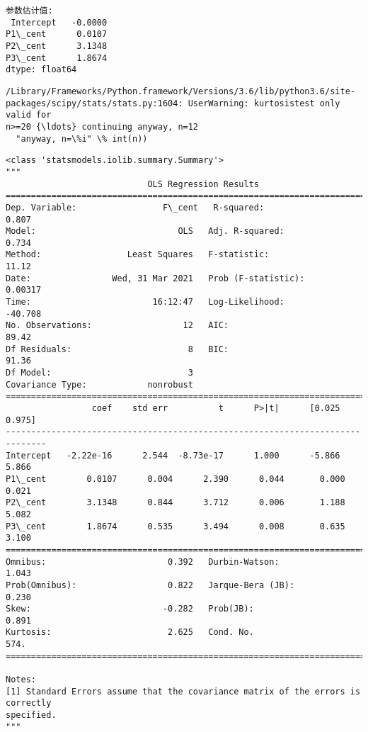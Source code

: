 \documentclass[11pt]{ctexart}
\makeatletter
\newcommand{\boxspacing}{\kern\kvtcb@left@rule\kern\kvtcb@boxsep}
\newcommand{\prompt}[4]{
        {\ttfamily\llap{{\color{#2}[#3]:\hspace{3pt}#4}}\vspace{-\baselineskip}}
    }
\makeatother
\begin{document}
    \begin{Verbatim}[commandchars=\\\{\}]
参数估计值:
 Intercept   -0.0000
P1\_cent      0.0107
P2\_cent      3.1348
P3\_cent      1.8674
dtype: float64
    \end{Verbatim}

    \begin{Verbatim}[commandchars=\\\{\}]
/Library/Frameworks/Python.framework/Versions/3.6/lib/python3.6/site-
packages/scipy/stats/stats.py:1604: UserWarning: kurtosistest only valid for
n>=20 {\ldots} continuing anyway, n=12
  "anyway, n=\%i" \% int(n))
    \end{Verbatim}

            \begin{tcolorbox}[breakable, size=fbox, boxrule=.5pt, pad at break*=1mm, opacityfill=0]
\prompt{Out}{outcolor}{4}{\boxspacing}
\begin{Verbatim}[commandchars=\\\{\}]
<class 'statsmodels.iolib.summary.Summary'>
"""
                            OLS Regression Results
==============================================================================
Dep. Variable:                 F\_cent   R-squared:                       0.807
Model:                            OLS   Adj. R-squared:                  0.734
Method:                 Least Squares   F-statistic:                     11.12
Date:                Wed, 31 Mar 2021   Prob (F-statistic):            0.00317
Time:                        16:12:47   Log-Likelihood:                -40.708
No. Observations:                  12   AIC:                             89.42
Df Residuals:                       8   BIC:                             91.36
Df Model:                           3
Covariance Type:            nonrobust
==============================================================================
                 coef    std err          t      P>|t|      [0.025      0.975]
------------------------------------------------------------------------------
Intercept   -2.22e-16      2.544  -8.73e-17      1.000      -5.866       5.866
P1\_cent        0.0107      0.004      2.390      0.044       0.000       0.021
P2\_cent        3.1348      0.844      3.712      0.006       1.188       5.082
P3\_cent        1.8674      0.535      3.494      0.008       0.635       3.100
==============================================================================
Omnibus:                        0.392   Durbin-Watson:                   1.043
Prob(Omnibus):                  0.822   Jarque-Bera (JB):                0.230
Skew:                          -0.282   Prob(JB):                        0.891
Kurtosis:                       2.625   Cond. No.                         574.
==============================================================================

Notes:
[1] Standard Errors assume that the covariance matrix of the errors is correctly
specified.
"""
\end{Verbatim}
\end{tcolorbox}
        
\end{document}
